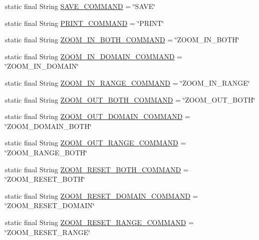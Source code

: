 \begin{DoxyCompactItemize}
\item 
static final String \mbox{\hyperlink{classorg_1_1jfree_1_1chart_1_1_chart_panel_aef77a67578e9803ad41b1c791eae7f21}{S\+A\+V\+E\+\_\+\+C\+O\+M\+M\+A\+ND}} = \char`\"{}S\+A\+VE\char`\"{}
\item 
static final String \mbox{\hyperlink{classorg_1_1jfree_1_1chart_1_1_chart_panel_ac5cc4dd3288d3340921d32319cdc2761}{P\+R\+I\+N\+T\+\_\+\+C\+O\+M\+M\+A\+ND}} = \char`\"{}P\+R\+I\+NT\char`\"{}
\item 
static final String \mbox{\hyperlink{classorg_1_1jfree_1_1chart_1_1_chart_panel_afcf8df9380c56151ee5f821c5d932f47}{Z\+O\+O\+M\+\_\+\+I\+N\+\_\+\+B\+O\+T\+H\+\_\+\+C\+O\+M\+M\+A\+ND}} = \char`\"{}Z\+O\+O\+M\+\_\+\+I\+N\+\_\+\+B\+O\+TH\char`\"{}
\item 
static final String \mbox{\hyperlink{classorg_1_1jfree_1_1chart_1_1_chart_panel_a8a4a2fbcfecb050e34ae70b7339e3ea4}{Z\+O\+O\+M\+\_\+\+I\+N\+\_\+\+D\+O\+M\+A\+I\+N\+\_\+\+C\+O\+M\+M\+A\+ND}} = \char`\"{}Z\+O\+O\+M\+\_\+\+I\+N\+\_\+\+D\+O\+M\+A\+IN\char`\"{}
\item 
static final String \mbox{\hyperlink{classorg_1_1jfree_1_1chart_1_1_chart_panel_a8181856e00041c9c68dfad7513facbb3}{Z\+O\+O\+M\+\_\+\+I\+N\+\_\+\+R\+A\+N\+G\+E\+\_\+\+C\+O\+M\+M\+A\+ND}} = \char`\"{}Z\+O\+O\+M\+\_\+\+I\+N\+\_\+\+R\+A\+N\+GE\char`\"{}
\item 
static final String \mbox{\hyperlink{classorg_1_1jfree_1_1chart_1_1_chart_panel_a4e77bc12219f372cf03309f6c5985412}{Z\+O\+O\+M\+\_\+\+O\+U\+T\+\_\+\+B\+O\+T\+H\+\_\+\+C\+O\+M\+M\+A\+ND}} = \char`\"{}Z\+O\+O\+M\+\_\+\+O\+U\+T\+\_\+\+B\+O\+TH\char`\"{}
\item 
static final String \mbox{\hyperlink{classorg_1_1jfree_1_1chart_1_1_chart_panel_ac00e0992ffd72c4b089e60d43182bc56}{Z\+O\+O\+M\+\_\+\+O\+U\+T\+\_\+\+D\+O\+M\+A\+I\+N\+\_\+\+C\+O\+M\+M\+A\+ND}} = \char`\"{}Z\+O\+O\+M\+\_\+\+D\+O\+M\+A\+I\+N\+\_\+\+B\+O\+TH\char`\"{}
\item 
static final String \mbox{\hyperlink{classorg_1_1jfree_1_1chart_1_1_chart_panel_abb096f4676aad46860e9feba2ba16af9}{Z\+O\+O\+M\+\_\+\+O\+U\+T\+\_\+\+R\+A\+N\+G\+E\+\_\+\+C\+O\+M\+M\+A\+ND}} = \char`\"{}Z\+O\+O\+M\+\_\+\+R\+A\+N\+G\+E\+\_\+\+B\+O\+TH\char`\"{}
\item 
static final String \mbox{\hyperlink{classorg_1_1jfree_1_1chart_1_1_chart_panel_a3768ab1f7fb6293b8ad4483bd124dd05}{Z\+O\+O\+M\+\_\+\+R\+E\+S\+E\+T\+\_\+\+B\+O\+T\+H\+\_\+\+C\+O\+M\+M\+A\+ND}} = \char`\"{}Z\+O\+O\+M\+\_\+\+R\+E\+S\+E\+T\+\_\+\+B\+O\+TH\char`\"{}
\item 
static final String \mbox{\hyperlink{classorg_1_1jfree_1_1chart_1_1_chart_panel_a81f5b9839e2a19fa5745e0f39c60afe8}{Z\+O\+O\+M\+\_\+\+R\+E\+S\+E\+T\+\_\+\+D\+O\+M\+A\+I\+N\+\_\+\+C\+O\+M\+M\+A\+ND}} = \char`\"{}Z\+O\+O\+M\+\_\+\+R\+E\+S\+E\+T\+\_\+\+D\+O\+M\+A\+IN\char`\"{}
\item 
static final String \mbox{\hyperlink{classorg_1_1jfree_1_1chart_1_1_chart_panel_a5f0de3eb34298ab398f77c1474150e9e}{Z\+O\+O\+M\+\_\+\+R\+E\+S\+E\+T\+\_\+\+R\+A\+N\+G\+E\+\_\+\+C\+O\+M\+M\+A\+ND}} = \char`\"{}Z\+O\+O\+M\+\_\+\+R\+E\+S\+E\+T\+\_\+\+R\+A\+N\+GE\char`\"{}
\end{DoxyCompactItemize}
